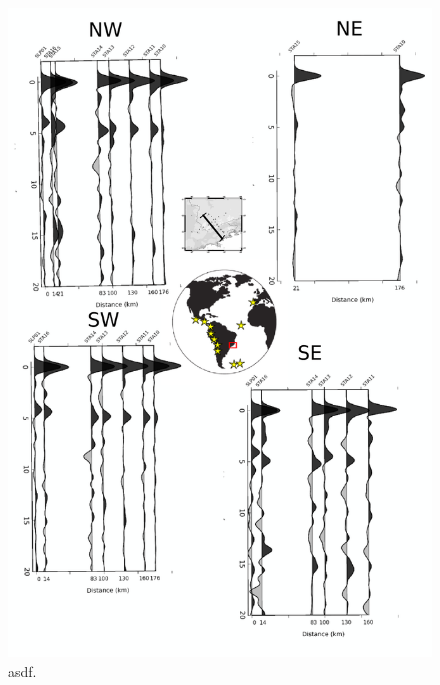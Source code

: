 \begin{figure}[!ht]
\centering
\includegraphics[scale=0.5]{Figs/RF_azimute_perfil2.png}
\caption{asdf.}
\label{RF_perfil2}
\end{figure}


